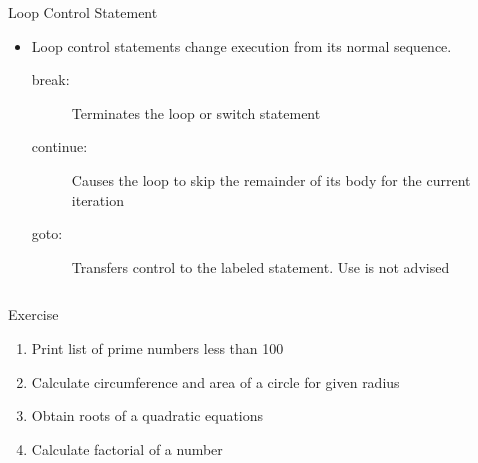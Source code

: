 \documentclass[10pt,t]{beamer}
\begin{document}
\begin{frame}[fragile]
  \begin{block}{}
    
  \end{block}
\end{frame}

\begin{frame}[fragile]{Loop Control Statement}
  \begin{itemize}
    \item Loop control statements change execution from its normal sequence.
      \begin{description}
        \item[break:] Terminates the loop or switch statement
        \item[continue:] Causes the loop to skip the remainder of its body for the current iteration
        \item[goto:] Transfers control to the labeled statement. Use is not advised
      \end{description}
  \end{itemize}
  \begin{columns}
    
    
  \end{columns}
\end{frame}

\begin{frame}{Exercise}
  \begin{enumerate}
    \item Print list of prime numbers less than 100
    \item Calculate circumference and area of a circle for given radius
    \item Obtain roots of a quadratic equations
    \item Calculate factorial of a number
  \end{enumerate}
\end{frame}
\end{document}
